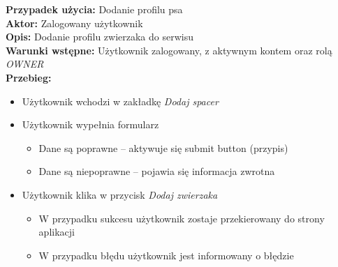 
\noindent
\textbf{Przypadek użycia:} Dodanie profilu psa\\
\textbf{Aktor:} Zalogowany użytkownik\\
\textbf{Opis:} Dodanie profilu zwierzaka do serwisu\\
\textbf{Warunki wstępne:} Użytkownik zalogowany, z aktywnym kontem oraz rolą \textit{OWNER}\\
\textbf{Przebieg:}
\begin{itemize} 
    \item Użytkownik wchodzi w zakładkę \textit{Dodaj spacer}
    \item Użytkownik wypełnia formularz
    \begin{itemize}
        \item Dane są poprawne -- aktywuje się submit button (przypis)
        \item Dane są niepoprawne -- pojawia się informacja zwrotna
    \end{itemize}
    \item Użytkownik klika w przycisk \textit{Dodaj zwierzaka}
    \begin{itemize}
        \item W przypadku sukcesu użytkownik zostaje przekierowany do strony aplikacji
        \item W przypadku błędu użytkownik jest informowany o błędzie
    \end{itemize}
\end{itemize}

